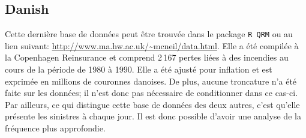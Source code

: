 	\subsection{Danish}
	Cette dernière base de données peut être trouvée dans le package \texttt{R QRM} ou au lien suivant: \url{http://www.ma.hw.ac.uk/~mcneil/data.html}. Elle a été compilée à la Copenhagen Reinsurance et comprend 2\,167 pertes liées à des incendies au cours de la période de 1980 à 1990. Elle a été ajusté pour inflation et est exprimée en millions de couronnes danoises.	De plus, aucune troncature n'a été faite sur les données; il n'est donc pas nécessaire de conditionner dans ce cas-ci.\\
	
	Par ailleurs, ce qui distingue cette base de données des deux autres, c'est qu'elle présente les sinistres à chaque jour. Il est donc possible d'avoir une analyse de la fréquence plus approfondie.
	